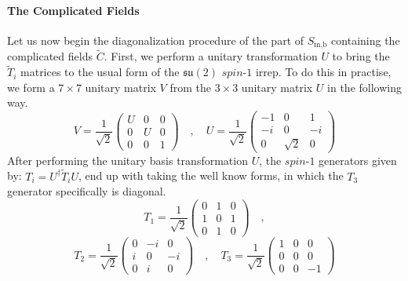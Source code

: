 \paragraph{The Complicated Fields}
Let us now begin the diagonalization procedure of the part of $S_{\text{m,b}}$ containing the complicated fields $\tilde{C}$. First, we perform a unitary transformation $U$ to bring the $\tilde{T}_i$ matrices to the usual form of the $\mathfrak{su}(2)$ $spin$-$1$ irrep. To do this in practise, we form a $7 \times 7$ unitary matrix $V$ from the $3 \times 3$ unitary matrix $U$ in the following way.
%
%
\begin{equation}
V = \frac{1}{\sqrt{2}} \left( \begin{array}{ccc}
U & 0 & 0 \\
0 & U & 0 \\
0 & 0 & 1
\end{array} \right)
%
\quad , \quad
%
U = \frac{1}{\sqrt{2}} \left( \begin{array}{ccc}
-1 & 0 & 1 \\
-i & 0 & -i \\
0 & \sqrt{2} & 0
\end{array} \right)
\end{equation}
%
%
After performing the unitary basis transformation $U$, the $spin$-$1$ generators given by: $T_i = U^\dagger \tilde{T}_i U$, end up with taking the well know forms, in which the $T_3$ generator specifically is diagonal.
%
%
\begin{equation*}
T_1 = \frac{1}{\sqrt{2}} \left( \begin{array}{ccc}
0 & 1 & 0 \\
1 & 0 & 1 \\
0 & 1 & 0
\end{array} \right)
%
\quad ,
\end{equation*}
%
%
\begin{equation}
T_2 = \frac{1}{\sqrt{2}} \left( \begin{array}{ccc}
0 & -i & 0 \\
i & 0 & -i \\
0 & i & 0
\end{array} \right)
%
\quad , \quad
%
T_3 = \frac{1}{\sqrt{2}} \left( \begin{array}{ccc}
1 & 0 & 0 \\
0 & 0 & 0 \\
0 & 0 & -1
\end{array} \right)
\end{equation}
%
%

